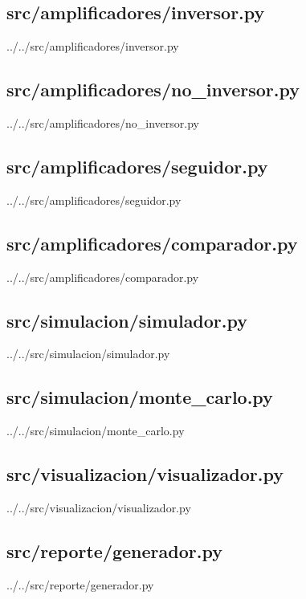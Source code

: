 ﻿\documentclass[12pt, letterpaper]{article}
\begin{document}
\newpage
\subsection*{src/amplificadores/inversor.py}

    {../../src/amplificadores/inversor.py}

\newpage
\subsection*{src/amplificadores/no\_inversor.py}

    {../../src/amplificadores/no_inversor.py}

\newpage
\subsection*{src/amplificadores/seguidor.py}

    {../../src/amplificadores/seguidor.py}

\newpage
\subsection*{src/amplificadores/comparador.py}

    {../../src/amplificadores/comparador.py}

\newpage
\subsection*{src/simulacion/simulador.py}

    {../../src/simulacion/simulador.py}

\newpage
\subsection*{src/simulacion/monte\_carlo.py}

    {../../src/simulacion/monte_carlo.py}

\newpage
\subsection*{src/visualizacion/visualizador.py}

    {../../src/visualizacion/visualizador.py}

\newpage
\subsection*{src/reporte/generador.py}

    {../../src/reporte/generador.py}
\end{document}
